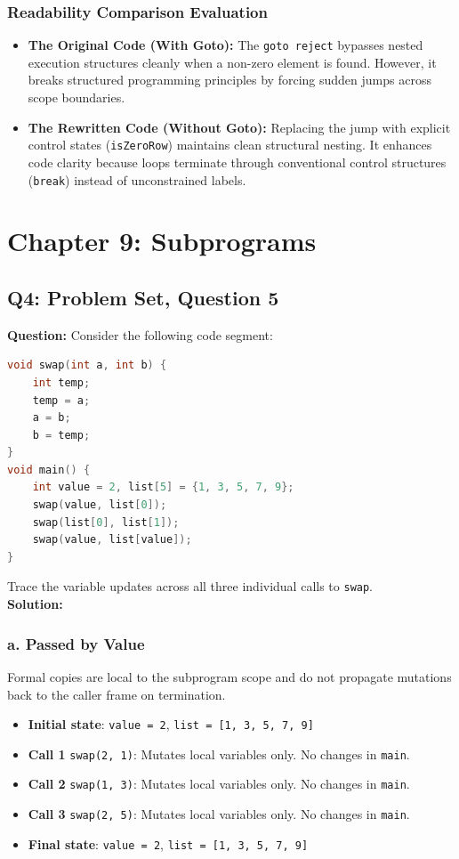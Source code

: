 \documentclass[11pt]{article}
\begin{document}
\subsubsection*{Readability Comparison Evaluation}
\begin{itemize}
    \item \textbf{The Original Code (With Goto):} The \texttt{goto reject} bypasses nested execution structures cleanly when a non-zero element is found. However, it breaks structured programming principles by forcing sudden jumps across scope boundaries.
    \item \textbf{The Rewritten Code (Without Goto):} Replacing the jump with explicit control states (\texttt{isZeroRow}) maintains clean structural nesting. It enhances code clarity because loops terminate through conventional control structures (\texttt{break}) instead of unconstrained labels.
\end{itemize}

\newpage
\section{Chapter 9: Subprograms}

\subsection{Q4: Problem Set, Question 5}
\textbf{Question:} Consider the following code segment:
\begin{lstlisting}[language=C]
void swap(int a, int b) {
    int temp;
    temp = a;
    a = b;
    b = temp;
}
void main() {
    int value = 2, list[5] = {1, 3, 5, 7, 9};
    swap(value, list[0]);
    swap(list[0], list[1]);
    swap(value, list[value]);
}
\end{lstlisting}
Trace the variable updates across all three individual calls to \texttt{swap}.\\

\noindent\textbf{Solution:}

\subsubsection*{a. Passed by Value}
Formal copies are local to the subprogram scope and do not propagate mutations back to the caller frame on termination.
\begin{itemize}
    \item \textbf{Initial state}: \texttt{value = 2}, \texttt{list = [1, 3, 5, 7, 9]}
    \item \textbf{Call 1} \texttt{swap(2, 1)}: Mutates local variables only. No changes in \texttt{main}.
    \item \textbf{Call 2} \texttt{swap(1, 3)}: Mutates local variables only. No changes in \texttt{main}.
    \item \textbf{Call 3} \texttt{swap(2, 5)}: Mutates local variables only. No changes in \texttt{main}.
    \item \textbf{Final state}: \texttt{value = 2}, \texttt{list = [1, 3, 5, 7, 9]}
\end{itemize}
\end{document}
